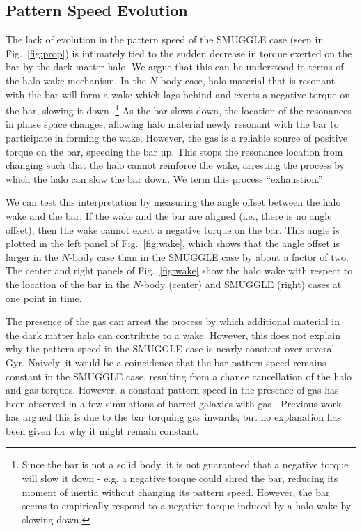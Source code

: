 \documentclass[fleqn,usenatbib]{mnras}
\newcommand{\Nbody}{$N$-body}
\begin{document}
\subsection{Pattern Speed Evolution}
The lack of evolution in the pattern speed of the SMUGGLE case (seen in
Fig.~\ref{fig:prop}) is intimately tied to the sudden decrease in torque exerted
on the bar by the dark matter halo. We argue that this can be understood in
terms of the halo wake mechanism. In the \Nbody{} case, halo material that is
resonant with the bar will form a wake which lags behind and exerts a negative
torque on the bar, slowing it down \citep{1984MNRAS.209..729T,
1985MNRAS.213..451W, 1992ApJ...400...80H}.\footnote{Since the bar is not a solid
body, it is not guaranteed that a negative torque will slow it down - e.g. a
negative torque could shred the bar, reducing its moment of inertia without
changing its pattern speed. However, the bar seems to empirically respond to a
negative torque induced by a halo wake by slowing down.} As the bar slows down,
the location of the resonances in phase space changes, allowing halo material
newly resonant with the bar to participate in forming the wake. However, the gas
is a reliable source of positive torque on the bar, speeding the bar up. This
stops the resonance location from changing such that the halo cannot reinforce
the wake, arresting the process by which the halo can slow the bar down. We term
this process ``exhaustion.''

We can test this interpretation by measuring the angle offset between the halo
wake and the bar. If the wake and the bar are aligned (i.e., there is no angle
offset), then the wake cannot exert a negative torque on the bar. This angle
is plotted in the left panel of Fig.~\ref{fig:wake}, which shows that the
angle offset is larger in the \Nbody{} case than in the SMUGGLE case by about a
factor of two. The center and right panels of Fig.~\ref{fig:wake} show the halo
wake with respect to the location of the bar in the \Nbody{} (center) and SMUGGLE
(right) cases at one point in time.

The presence of the gas can arrest the process by which additional material in
the dark matter halo can contribute to a wake. However, this does not explain
why the pattern speed in the SMUGGLE case is nearly constant over several Gyr.
Naively, it would be a coincidence that the bar pattern speed remains constant
in the SMUGGLE case, resulting from a chance cancellation of the halo and gas
torques. However, a constant pattern speed in the presence of gas has been
observed in a few simulations of barred galaxies with
gas \citep{1993AA...268...65F, 2010ApJ...719.1470V, 2014MNRAS.438L..81A}. Previous
work has argued this is due to the bar torquing gas inwards, but no explanation
has been given for why it might remain constant.
\end{document}
